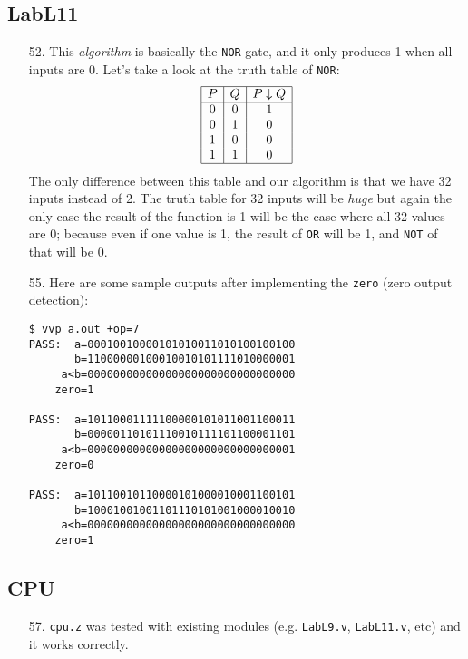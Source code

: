 \documentclass{article}
\begin{document}
\subsection{LabL11}
\begin{enumerate}
\item[52. ] This \textit{algorithm} is basically the \verb$NOR$ gate, and it
only produces 1 when all inputs are 0. Let's take a look at the truth table
of \verb$NOR$:
\begin{displaymath}
\begin{array}{|c|c|c|}
\hline
   P
 & Q
 & P \downarrow Q \\
\hline
0 & 0 & 1 \\
0 & 1 & 0 \\
1 & 0 & 0 \\
1 & 1 & 0 \\
\hline
\end{array}
\end{displaymath}
The only difference between this table and our algorithm is that we have
32 inputs instead of 2. The truth table for 32 inputs will be \textit{huge}
but again the only case the result of the function is 1 will be the case where
all 32 values are 0; because even if one value is 1, the result of \verb$OR$
will be 1, and \verb$NOT$ of that will be 0.

\item[55. ] Here are some sample outputs after implementing the
\verb$zero$ (zero output detection):
\begin{verbatim}
$ vvp a.out +op=7
PASS:  a=00010010000101010011010100100100
       b=11000000100010010101111010000001
     a<b=00000000000000000000000000000000
    zero=1

PASS:  a=10110001111100000101011001100011
       b=00000110101110010111101100001101
     a<b=00000000000000000000000000000001
    zero=0

PASS:  a=10110010110000101000010001100101
       b=10001001001101110101001000010010
     a<b=00000000000000000000000000000000
    zero=1
\end{verbatim}
\end{enumerate}

\subsection{CPU}
\begin{enumerate}
\item[57. ] \verb$cpu.z$ was tested with existing modules (e.g. \verb$LabL9.v$,
\verb$LabL11.v$, etc) and it works correctly.
\end{enumerate}
\end{document}
